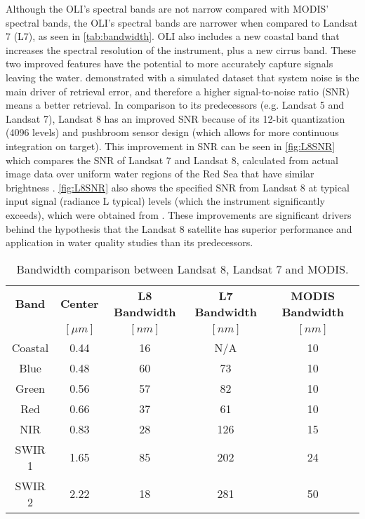 Although the OLI's spectral bands are not narrow compared with MODIS' spectral bands, the OLI's spectral bands are narrower when compared to Landsat 7 (L7), as seen in \autoref{tab:bandwidth}. OLI also includes a new coastal band that increases the spectral resolution of the instrument, plus a new cirrus band. These two improved features have the potential to more accurately capture signals leaving the water. \citet{Gerace:2013} demonstrated with a simulated dataset that system noise is the main driver of retrieval error, and therefore a higher signal-to-noise ratio (SNR) means a better retrieval. In comparison to its predecessors (e.g. Landsat 5 and Landsat 7), Landsat 8 has an improved SNR because of its 12-bit quantization (4096 levels) and pushbroom sensor design (which allows for more continuous integration on target). This improvement in SNR can be seen in \autoref{fig:L8SNR} which compares the SNR of Landsat 7 and Landsat 8, calculated from actual image data over uniform water regions of the Red Sea that have similar brightness \citep{Hu:2012}. \autoref{fig:L8SNR} also shows the specified SNR from Landsat 8 at typical input signal (radiance L typical) levels (which the instrument significantly exceeds), which were obtained from \citet{Irons:2012}. These improvements are significant drivers behind the hypothesis that the Landsat 8 satellite has superior performance and application in water quality studies than its predecessors.


\begin{table}[!ht]
\caption{ Bandwidth comparison between Landsat 8, Landsat 7 and MODIS. \label{tab:bandwidth}} 
\centering
      \begin{tabular}{c|c|c|c|c}
          \bfseries{Band}& \bfseries{Center}   & \bfseries{L8 Bandwidth} & \bfseries{L7 Bandwidth} & \bfseries{MODIS Bandwidth} \\ 
                  & \bfseries{$[\mu m]$} & $[nm]$   & $[nm]$ & $[nm]$   \\ \hline \hline
          Coastal & 0.44 & 16 & N/A & 10  \\
          Blue    & 0.48 & 60 & 73  & 10  \\
          Green   & 0.56 & 57 & 82  & 10  \\
          Red     & 0.66 & 37 & 61  & 10  \\  
          NIR     & 0.83 & 28 & 126 & 15  \\
          SWIR 1  & 1.65 & 85 & 202 & 24  \\
          SWIR 2  & 2.22 & 18 & 281 & 50  \\ 
       \end{tabular}
\end{table}

